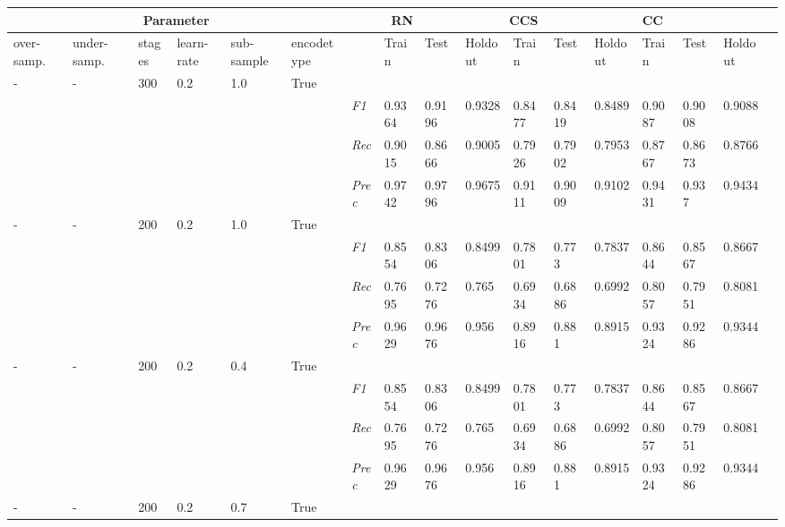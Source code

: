 \begin{table}[]
\tiny
\tabcolsep=0.11cm
\begin{tabularx}{\textwidth}{XXXXXX|X|XXX|XXX|XXXX}
\toprule
\multicolumn{6}{c}{Parameter} & \multicolumn{3}{c}{RN} & \multicolumn{3}{c}{CCS} & \multicolumn{3}{c}{CC} \\ \midrule
over-\newline samp. & under-\newline samp. & stages &learn-\newline rate & sub-\newline sample & encode\newline type & & Train &  Test & Holdout & Train &  Test & Holdout & Train &  Test & Holdout \\ \midrule
- & - & 300 & 0.2 & 1.0 &True & & & & & & & & & \\
& & & & & & \textit{F1} & 0.9364 & 0.9196 & 0.9328 & 0.8477 & 0.8419        & 0.8489        & 0.9087        & 0.9008        & 0.9088        \\
& & & & & & \textit{Rec} & 0.9015 & 0.8666 & 0.9005    & 0.7926 & 0.7902    & 0.7953    & 0.8767    & 0.8673    & 0.8766    \\
& & & & & & \textit{Prec} & 0.9742 & 0.9796 & 0.9675 & 0.9111 & 0.9009 & 0.9102 & 0.9431 & 0.937 & 0.9434 \\ \midrule
- & - & 200 & 0.2 & 1.0 &True & & & & & & & & & \\
& & & & & & \textit{F1} & 0.8554 & 0.8306 & 0.8499 & 0.7801 & 0.773        & 0.7837        & 0.8644        & 0.8567        & 0.8667        \\
& & & & & & \textit{Rec} & 0.7695 & 0.7276 & 0.765    & 0.6934 & 0.6886    & 0.6992    & 0.8057    & 0.7951    & 0.8081    \\
& & & & & & \textit{Prec} & 0.9629 & 0.9676 & 0.956 & 0.8916 & 0.881 & 0.8915 & 0.9324 & 0.9286 & 0.9344 \\ \midrule
- & - & 200 & 0.2 & 0.4 &True & & & & & & & & & \\
& & & & & & \textit{F1} & 0.8554 & 0.8306 & 0.8499 & 0.7801 & 0.773        & 0.7837        & 0.8644        & 0.8567        & 0.8667        \\
& & & & & & \textit{Rec} & 0.7695 & 0.7276 & 0.765    & 0.6934 & 0.6886    & 0.6992    & 0.8057    & 0.7951    & 0.8081    \\
& & & & & & \textit{Prec} & 0.9629 & 0.9676 & 0.956 & 0.8916 & 0.881 & 0.8915 & 0.9324 & 0.9286 & 0.9344 \\ \midrule
- & - & 200 & 0.2 & 0.7 &True & & & & & & & & & \\

\end{tabularx}
\end{table}
